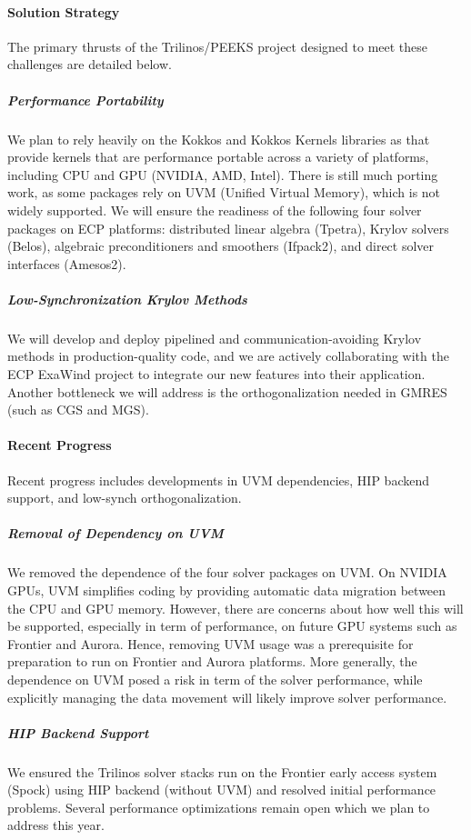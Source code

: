 \paragraph{Solution Strategy}

The primary thrusts of the Trilinos/PEEKS project designed to meet these challenges are detailed below.

\subparagraph{Performance Portability}
        We plan to rely heavily on the Kokkos and Kokkos Kernels libraries as that provide kernels that are performance portable across a variety of platforms, including CPU and GPU (NVIDIA, AMD, Intel). There is still much porting work, as some packages rely on UVM (Unified Virtual Memory), which is not widely supported.
        We will ensure the readiness of the following four solver packages on ECP platforms:
        distributed linear algebra (Tpetra), Krylov solvers (Belos), algebraic preconditioners and smoothers (Ifpack2), 
        and direct solver interfaces (Amesos2).
\subparagraph{Low-Synchronization Krylov Methods}
    	We will develop and deploy pipelined and 
	communication-avoiding Krylov methods in production-quality code, and 
	we are actively collaborating with the ECP ExaWind project to integrate 
        our new features into their application. Another bottleneck we will address is the orthogonalization needed in GMRES (such as CGS and MGS).


\paragraph{Recent Progress}
Recent progress includes developments in UVM dependencies, HIP backend support, and low-synch orthogonalization.

\subparagraph{Removal of Dependency on UVM}
We removed the dependence of the four solver packages on UVM.
On NVIDIA GPUs, UVM simplifies coding by providing automatic data migration between the CPU and GPU memory. However, there are concerns about how well this will be supported, especially in term of performance, on future GPU systems such as Frontier and Aurora. Hence, removing UVM usage was a prerequisite for preparation to run on Frontier and Aurora platforms. 
More generally, the dependence on UVM posed a risk in term of the solver performance, while explicitly managing the data movement will likely improve solver performance. 

\subparagraph{HIP Backend Support}
We ensured the Trilinos solver stacks run on the Frontier early access system (Spock) using HIP backend (without UVM) and resolved initial performance problems. Several performance optimizations remain open which we plan to address this year.

